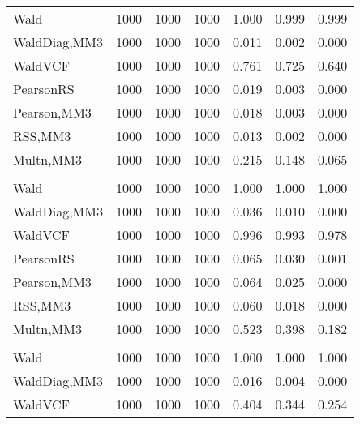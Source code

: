 \documentclass[
]{article}
\begin{document}
\begin{table}[H]
{\begin{tabular}[t]{lrrrrrr}
\hspace{1em}Wald & 1000 & 1000 & 1000 & 1.000 & 0.999 & 0.999\\
\hspace{1em}WaldDiag,MM3 & 1000 & 1000 & 1000 & 0.011 & 0.002 & 0.000\\
\hspace{1em}WaldVCF & 1000 & 1000 & 1000 & 0.761 & 0.725 & 0.640\\
\hspace{1em}PearsonRS & 1000 & 1000 & 1000 & 0.019 & 0.003 & 0.000\\
\hspace{1em}Pearson,MM3 & 1000 & 1000 & 1000 & 0.018 & 0.003 & 0.000\\
\hspace{1em}RSS,MM3 & 1000 & 1000 & 1000 & 0.013 & 0.002 & 0.000\\
\hspace{1em}Multn,MM3 & 1000 & 1000 & 1000 & 0.215 & 0.148 & 0.065\\
\addlinespace[0.3em]
\multicolumn{7}{l}{\textbf{2F 10V}}\\
\hspace{1em}Wald & 1000 & 1000 & 1000 & 1.000 & 1.000 & \vphantom{1} 1.000\\
\hspace{1em}WaldDiag,MM3 & 1000 & 1000 & 1000 & 0.036 & 0.010 & 0.000\\
\hspace{1em}WaldVCF & 1000 & 1000 & 1000 & 0.996 & 0.993 & 0.978\\
\hspace{1em}PearsonRS & 1000 & 1000 & 1000 & 0.065 & 0.030 & 0.001\\
\hspace{1em}Pearson,MM3 & 1000 & 1000 & 1000 & 0.064 & 0.025 & 0.000\\
\hspace{1em}RSS,MM3 & 1000 & 1000 & 1000 & 0.060 & 0.018 & 0.000\\
\hspace{1em}Multn,MM3 & 1000 & 1000 & 1000 & 0.523 & 0.398 & 0.182\\
\addlinespace[0.3em]
\multicolumn{7}{l}{\textbf{3F 15V}}\\
\hspace{1em}Wald & 1000 & 1000 & 1000 & 1.000 & 1.000 & 1.000\\
\hspace{1em}WaldDiag,MM3 & 1000 & 1000 & 1000 & 0.016 & 0.004 & 0.000\\
\hspace{1em}WaldVCF & 1000 & 1000 & 1000 & 0.404 & 0.344 & 0.254\\

\end{tabular}}
\end{table}
\end{document}
